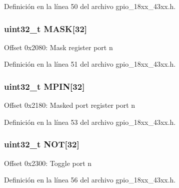 Definición en la línea 50 del archivo gpio\+\_\+18xx\+\_\+43xx.\+h.

\subsubsection[{\texorpdfstring{M\+A\+SK}{MASK}}]{ uint32\+\_\+t M\+A\+SK\mbox{[}32\mbox{]}}\hypertarget{struct_l_p_c___g_p_i_o___t_a037eda1f7d90b5c572f8d993da5ee8c2}{}\label{struct_l_p_c___g_p_i_o___t_a037eda1f7d90b5c572f8d993da5ee8c2}
Offset 0x2080\+: Mask register port n 

Definición en la línea 51 del archivo gpio\+\_\+18xx\+\_\+43xx.\+h.

\subsubsection[{\texorpdfstring{M\+P\+IN}{MPIN}}]{ uint32\+\_\+t M\+P\+IN\mbox{[}32\mbox{]}}\hypertarget{struct_l_p_c___g_p_i_o___t_aa7ddc0fe8597d34934321eafb130a946}{}\label{struct_l_p_c___g_p_i_o___t_aa7ddc0fe8597d34934321eafb130a946}
Offset 0x2180\+: Masked port register port n 

Definición en la línea 53 del archivo gpio\+\_\+18xx\+\_\+43xx.\+h.

\subsubsection[{\texorpdfstring{N\+OT}{NOT}}]{ uint32\+\_\+t N\+OT\mbox{[}32\mbox{]}}\hypertarget{struct_l_p_c___g_p_i_o___t_a9aa40dfddcb9ac35511ef18d693953af}{}\label{struct_l_p_c___g_p_i_o___t_a9aa40dfddcb9ac35511ef18d693953af}
Offset 0x2300\+: Toggle port n 

Definición en la línea 56 del archivo gpio\+\_\+18xx\+\_\+43xx.\+h.

